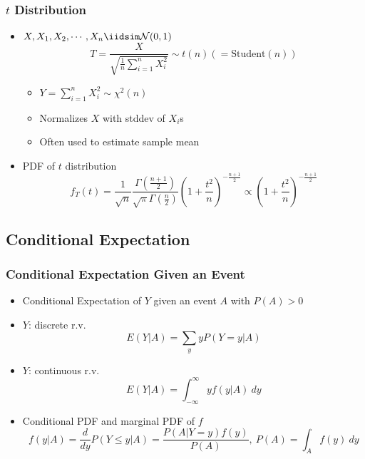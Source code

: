 \subsubsection*{$t$ Distribution}
\begin{itemize}
    \item $X,X_1,X_2,\cdots,X_n\iidsim\mathcal{N}(0,1)$
    \begin{equation}
        T=\frac{X}{\sqrt{\frac{1}{n}\sum_{i=1}^nX_i^2}}\sim t(n)(=\text{Student}(n))
    \end{equation}
    \clearpage
    \begin{itemize}
        \item $Y=\sum_{i=1}^nX_i^2\sim\chi^2(n)$
        \item Normalizes $X$ with stddev of $X_i$s
        \item Often used to estimate sample mean
    \end{itemize}
    \item PDF of $t$ distribution
    \begin{equation}
        f_T(t)=\frac{1}{\sqrt{n}}\frac{\Gamma\left(\frac{n+1}{2}\right)}{\sqrt{\pi}\Gamma\left(\frac{n}{2}\right)}\left(1+\frac{t^2}{n}\right)^{-\frac{n+1}{2}}\varpropto\left(1+\frac{t^2}{n}\right)^{-\frac{n+1}{2}}
    \end{equation}
\end{itemize}

\subsection{Conditional Expectation}

\subsubsection*{Conditional Expectation Given an Event}
\begin{itemize}
    \item Conditional Expectation of $Y$ given an event $A$ with $P(A)>0$
    \item $Y$: discrete r.v.
    \begin{equation}
        E(Y|A)=\sum_yyP(Y=y|A)
    \end{equation}
    \item $Y$: continuous r.v.
    \begin{equation}
        E(Y|A)=\int_{-\infty}^\infty yf(y|A)~dy
    \end{equation}
    \item Conditional PDF and marginal PDF of $f$
    \begin{equation}
        f(y|A)=\frac{d}{dy}P(Y\leq y|A)=\frac{P(A|Y=y)f(y)}{P(A)},~P(A)=\int_Af(y)~dy
    \end{equation}
\end{itemize}

